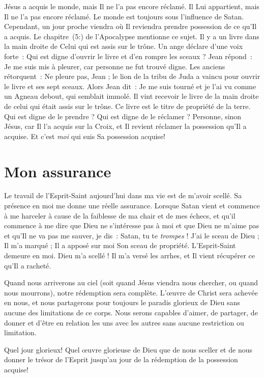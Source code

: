 Jésus a acquis le monde, mais Il ne l'a pas encore réclamé.
 Il Lui appartient, mais Il ne l'a pas encore réclamé.
 Le monde est toujours sous l'influence de Satan.
 Cependant, un jour proche viendra où Il reviendra prendre possession
 de ce qu'Il a acquis.
 Le chapitre~(5:) de l'Apocalypse mentionne ce sujet.
 Il y a un livre dans la main droite de Celui qui est assis sur le trône.
 Un ange déclare d'une voix forte~:
 \og Qui est digne d'ouvrir le livre et d'en rompre les sceaux ? \fg{}
 Jean répond~: \og Je me suis mis à pleurer,
 car personne ne fut trouvé digne. \fg{}
 Les anciens rétorquent~: \og Ne pleure pas, Jean ;
 le lion de la tribu de Juda a vaincu pour ouvrir
 le livre et ses sept sceaux. \fg{}
 Alors Jean dit~: \og Je me suis tourné et je l'ai vu comme un Agneau debout,
 qui semblait immolé. Il vint recevoir le livre de la main droite
 de celui qui était assis sur le trône. \fg{}
 Ce livre est le titre de propriété de la terre.
 Qui est digne de le prendre ? Qui est digne de le réclamer ?
 Personne, sinon Jésus, car Il l'a acquis sur la Croix, et Il revient
 réclamer la possession qu'Il a acquise.
 Et c'est \emph{moi} qui suis Sa possession acquise!


\section{Mon assurance}

Le travail de l'Esprit-Saint aujourd'hui dans ma vie est de m'avoir scellé.
 Sa présence en moi me donne une réelle assurance.
 Lorsque Satan  vient et commence à me harceler à cause
 de la faiblesse de ma chair et de mes échecs,
 et qu'il commence à me dire que Dieu
 ne s'intéresse pas à moi et que Dieu ne m'aime pas et qu'Il ne va pas
 me sauver, je dis~:
 \og Satan, tu te \emph{trompes} ! J'ai le sceau de Dieu ; Il m'a marqué ;
 Il a apposé sur moi Son sceau de propriété. L'Esprit-Saint demeure en moi.
 Dieu m'a scellé ! Il m'a versé les arrhes, et Il vient récupérer
 ce qu'Il a racheté. \fg{}

Quand nous arriverons au ciel (soit quand Jésus viendra nous chercher,
 ou quand nous mourrons), notre rédemption sera complète.
 L'œu\-vre de Christ sera achevée en nous, et nous partagerons pour
 toujours le paradis glorieux de Dieu sans aucune des limitations
 de ce corps. Nous serons capables d'aimer, de partager, de donner
 et d'être en relation les uns avec les autres sans aucune restriction
 ou limitation.

Quel jour glorieux! Quel œuvre glorieuse de Dieu que de nous sceller
 et de nous donner le trésor de l'Esprit jusqu'au jour de la rédemption
 de la possession acquise!


